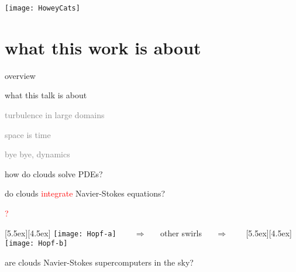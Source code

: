 \begin{frame}{}
\hfill\texttt{[image: HoweyCats]}
\end{frame}


\begin{frame}
  \titlepage
\end{frame}


\section[what this work is about]
 {what this work is about}

\begin{frame}{overview}
\begin{enumerate}
              \item {\Large
what this talk is about
                  }\textcolor{gray}{\small
              \item
turbulence in large domains
              \item
space is time
              \item
bye bye, dynamics
                    }
            \end{enumerate}
\end{frame}

\begin{frame}{how do clouds solve PDEs?}

\vfill

do clouds \textcolor{red}{integrate} Navier-Stokes equations?

\begin{center}
\centerline{\textcolor{red}{\Huge ?}}

\begin{minipage}[t]{\textwidth}
	\begin{center}
\centerline{
\raisebox{-4.0ex}[5.5ex][4.5ex]
		 {\texttt{[image: Hopf-a]}}
~~~ $\Longrightarrow$ ~~ {other swirls} ~~ $\Longrightarrow$ ~~~
	\raisebox{-4.0ex}[5.5ex][4.5ex]
		 {\texttt{[image: Hopf-b]}}
          }
	\end{center}
\end{minipage}
\end{center}

are clouds Navier-Stokes supercomputers in the sky?

\end{frame}

